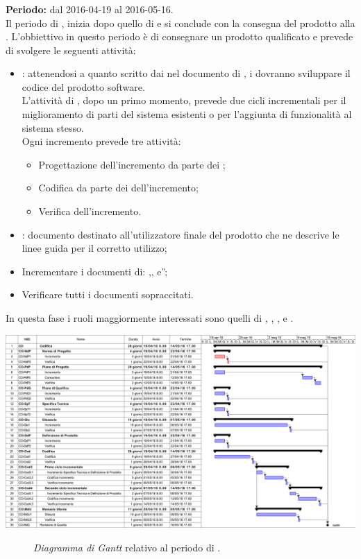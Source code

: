 \subsubsection{\CO}
\textbf{Periodo:} dal 2016-04-19 al 2016-05-16. \\
Il periodo di \CO, inizia dopo quello di \PD  e si conclude con la consegna del prodotto alla \RQ. L'obbiettivo in questo periodo è di consegnare un prodotto qualificato e prevede di svolgere le seguenti attività:
\begin{itemize}
	\item \textbf{\CO}: attenendosi a quanto scritto dai \textit{\Progs} nel documento di \textit{\DDP}, i \textit{\Progrs} dovranno sviluppare il codice del prodotto software.\\
	L'attività di \CO, dopo un primo momento, prevede due cicli incrementali per il miglioramento di parti del sistema esistenti o per l'aggiunta di funzionalità al sistema stesso. \\
	Ogni incremento prevede tre attività:
	\begin{itemize}
		\item Progettazione dell'incremento da parte dei \textit{\Progs};  
		\item Codifica da parte dei \textit{\Progrs} dell'incremento;
		\item Verifica dell'incremento. 
	\end{itemize}
	\item \textit{\MU}: documento destinato all'utilizzatore finale del prodotto che ne descrive le linee guida per il corretto utilizzo;
	\item Incrementare i documenti di: \textit{\NdP},\textit{\PdP}, \textit{\PdQ} e \textit{\G};
	\item Verificare tutti i documenti sopraccitati.
\end{itemize}
In questa fase i ruoli maggiormente interessati sono quelli di \textit{\Amm}, \textit{\Res}, \textit{\Prog}, \textit{\Progr} e \textit{\Ver}. 
\begin{center}
	\includegraphics[keepaspectratio = true, width=16cm]{immagini/PdP_CodificaGantt.png}
\end{center}
\begin{figure}[h]
	\caption{\textit{Diagramma di Gantt} relativo al periodo di \CO.}\label{etichetta}
\end{figure}

